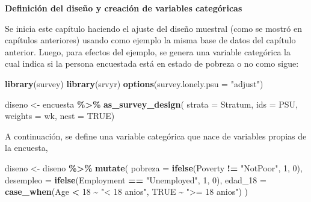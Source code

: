 \documentclass[
  12pt,
]{book}
\newenvironment{Shaded}{\begin{snugshade}}{\end{snugshade}}
\newcommand{\AttributeTok}[1]{\textcolor[rgb]{0.13,0.29,0.53}{#1}}
\newcommand{\ConstantTok}[1]{\textcolor[rgb]{0.56,0.35,0.01}{#1}}
\newcommand{\DecValTok}[1]{\textcolor[rgb]{0.00,0.00,0.81}{#1}}
\newcommand{\FunctionTok}[1]{\textcolor[rgb]{0.13,0.29,0.53}{\textbf{#1}}}
\newcommand{\NormalTok}[1]{#1}
\newcommand{\OtherTok}[1]{\textcolor[rgb]{0.56,0.35,0.01}{#1}}
\newcommand{\SpecialCharTok}[1]{\textcolor[rgb]{0.81,0.36,0.00}{\textbf{#1}}}
\newcommand{\StringTok}[1]{\textcolor[rgb]{0.31,0.60,0.02}{#1}}
\begin{document}
\textbf{Definición del diseño y creación de variables categóricas}

Se inicia este capítulo haciendo el ajuste del diseño muestral (como se mostró en capítulos anteriores) usando como ejemplo la misma base de datos del capítulo anterior. Luego, para efectos del ejemplo, se genera una variable categórica la cual indica si la persona encuestada está en estado de pobreza o no como sigue:

\begin{Shaded}
\begin{Highlighting}[]
\FunctionTok{library}\NormalTok{(survey)}
\FunctionTok{library}\NormalTok{(srvyr)}
\FunctionTok{options}\NormalTok{(}\AttributeTok{survey.lonely.psu =} \StringTok{"adjust"}\NormalTok{)}

\NormalTok{diseno }\OtherTok{\textless{}{-}}\NormalTok{ encuesta }\SpecialCharTok{\%\textgreater{}\%} 
          \FunctionTok{as\_survey\_design}\NormalTok{(}
                           \AttributeTok{strata =}\NormalTok{ Stratum,  }
                           \AttributeTok{ids =}\NormalTok{ PSU,         }
                           \AttributeTok{weights =}\NormalTok{ wk,      }
                           \AttributeTok{nest =} \ConstantTok{TRUE}\NormalTok{)}
\end{Highlighting}
\end{Shaded}

A continuación, se define una variable categórica que nace de variables propias de la encuesta,

\begin{Shaded}
\begin{Highlighting}[]
\NormalTok{diseno }\OtherTok{\textless{}{-}}\NormalTok{ diseno }\SpecialCharTok{\%\textgreater{}\%} \FunctionTok{mutate}\NormalTok{(}
                     \AttributeTok{pobreza =} \FunctionTok{ifelse}\NormalTok{(Poverty }\SpecialCharTok{!=} \StringTok{"NotPoor"}\NormalTok{, }\DecValTok{1}\NormalTok{, }\DecValTok{0}\NormalTok{),}
                     \AttributeTok{desempleo =} \FunctionTok{ifelse}\NormalTok{(Employment }\SpecialCharTok{==} \StringTok{"Unemployed"}\NormalTok{, }\DecValTok{1}\NormalTok{, }\DecValTok{0}\NormalTok{),}
                     \AttributeTok{edad\_18 =} \FunctionTok{case\_when}\NormalTok{(Age }\SpecialCharTok{\textless{}} \DecValTok{18} \SpecialCharTok{\textasciitilde{}} \StringTok{"\textless{} 18 anios"}\NormalTok{, }\ConstantTok{TRUE} \SpecialCharTok{\textasciitilde{}} \StringTok{"\textgreater{}= 18 anios"}\NormalTok{)}
\NormalTok{)}
\end{Highlighting}
\end{Shaded}
\end{document}
